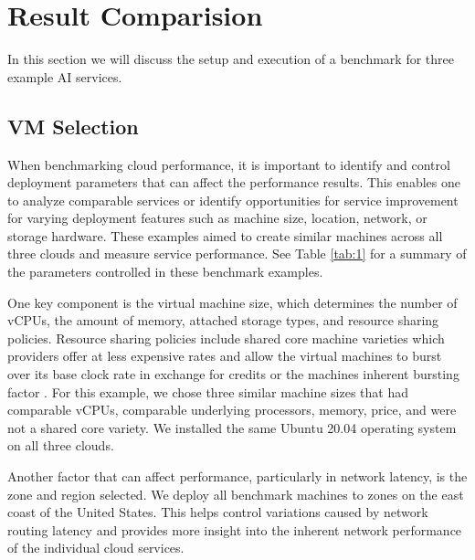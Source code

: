 \section{Result Comparision}\label{result-comparision}

In this section we will discuss the setup and execution of a benchmark
for three example AI services.

\subsection{VM Selection}\label{vm-selection}

When benchmarking cloud performance, it is important to identify and
control deployment parameters that can affect the performance results.
This enables one to analyze comparable services or identify
opportunities for service improvement for varying deployment features
such as machine size, location, network, or storage hardware. These
examples aimed to create similar machines across all three clouds and
measure service performance. See Table \ref{tab:1} for a summary of the parameters
controlled in these benchmark examples.

One key component is the virtual machine size, which determines the
number of vCPUs, the amount of memory, attached storage types, and
resource sharing policies. Resource sharing policies include shared
core machine varieties which providers offer at less expensive rates
and allow the virtual machines to burst over its base clock rate in
exchange for credits or the machines inherent bursting factor
\cite{amazon-instances,google-instances}. For this example, we chose
three similar machine sizes that had comparable vCPUs, comparable
underlying processors, memory, price, and were not a shared core
variety. We installed the same Ubuntu 20.04 operating system on all
three clouds.

Another factor that can affect performance, particularly in network
latency, is the zone and region selected. We deploy all benchmark
machines to zones on the east coast of the United States. This helps
control variations caused by network routing latency and provides more
insight into the inherent network performance of the individual cloud
services.


